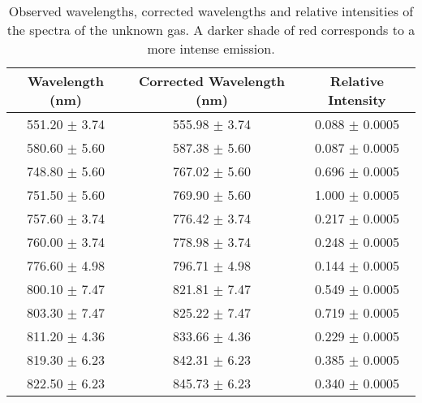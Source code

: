 \begin{table}
    \begin{adjustbox}{width=0.7\textwidth, center}
        \begin{tabular}{|c|c|c|}
            \hline
            Wavelength (nm)                     & Corrected Wavelength (nm) & Relative Intensity  \\
            \hline
            \rowcolor{red!8}551.20 $\pm$ 3.74   & 555.98 $\pm$ 3.74         & 0.088  $\pm$ 0.0005 \\
            \rowcolor{red!8}580.60 $\pm$ 5.60   & 587.38 $\pm$ 5.60         & 0.087  $\pm$ 0.0005 \\
            \rowcolor{red!69}748.80 $\pm$ 5.60  & 767.02 $\pm$ 5.60         & 0.696  $\pm$ 0.0005 \\
            \rowcolor{red!100}751.50 $\pm$ 5.60 & 769.90 $\pm$ 5.60         & 1.000  $\pm$ 0.0005 \\
            \rowcolor{red!21}757.60 $\pm$ 3.74  & 776.42 $\pm$ 3.74         & 0.217  $\pm$ 0.0005 \\
            \rowcolor{red!24}760.00 $\pm$ 3.74  & 778.98 $\pm$ 3.74         & 0.248  $\pm$ 0.0005 \\
            \rowcolor{red!14}776.60 $\pm$ 4.98  & 796.71 $\pm$ 4.98         & 0.144  $\pm$ 0.0005 \\
            \rowcolor{red!54}800.10 $\pm$ 7.47  & 821.81 $\pm$ 7.47         & 0.549  $\pm$ 0.0005 \\
            \rowcolor{red!71}803.30 $\pm$ 7.47  & 825.22 $\pm$ 7.47         & 0.719  $\pm$ 0.0005 \\
            \rowcolor{red!22}811.20 $\pm$ 4.36  & 833.66 $\pm$ 4.36         & 0.229  $\pm$ 0.0005 \\
            \rowcolor{red!38}819.30 $\pm$ 6.23  & 842.31 $\pm$ 6.23         & 0.385  $\pm$ 0.0005 \\
            \rowcolor{red!34}822.50 $\pm$ 6.23  & 845.73 $\pm$ 6.23         & 0.340  $\pm$ 0.0005 \\
            \hline
        \end{tabular}
    \end{adjustbox}
    \caption{Observed wavelengths, corrected wavelengths and relative intensities of the spectra of the unknown gas. A darker shade of red corresponds to a more intense emission.}
    \label{tab:unknown}
\end{table}
